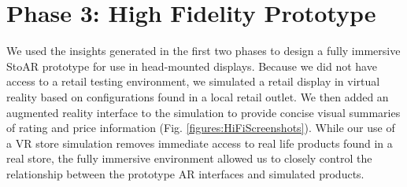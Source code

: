 \section{Phase 3: High Fidelity Prototype}
We used the insights generated in the first two phases to design a fully immersive StoAR prototype for use in head-mounted displays. Because we did not have access to a retail testing environment, we simulated a retail display in virtual reality based on configurations found in a local retail outlet. We then added an augmented reality interface to the simulation to provide concise visual summaries of rating and price information (Fig. \ref{figures:HiFiScreenshots}).
While our use of a VR store simulation removes immediate access to real life products found in a real store, the fully immersive environment allowed us to closely control the relationship between the prototype AR interfaces and simulated products.

